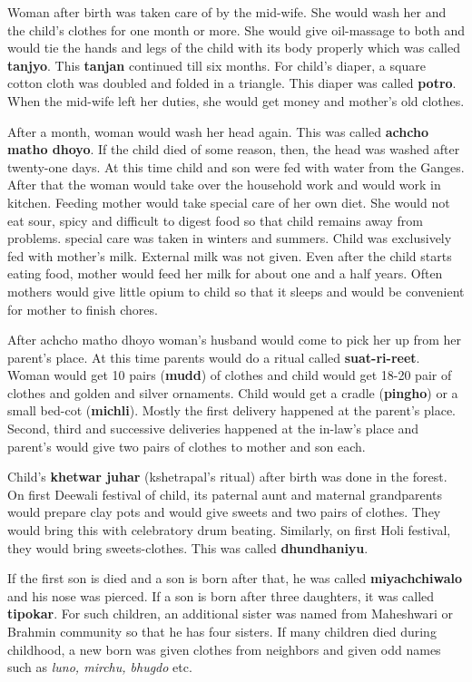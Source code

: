 Woman after birth was taken care of by the mid-wife. She would wash her and
the child's clothes for one month or more. She would give oil-massage to both
and would tie the hands and legs of the child with its body properly which was
called \textbf{tanjyo}. This \textbf{tanjan} continued till six months. For
child's diaper, a square cotton cloth was doubled and folded in a triangle.
This diaper was called \textbf{potro}. When the mid-wife left her duties, she
would get money and mother's old clothes.

After a month, woman would wash her head again. This was called \textbf{achcho
matho dhoyo}. If the child died of some reason, then, the head was washed after
twenty-one days. At this time child and son were fed with water from the
Ganges. After that the woman would take over the household work and would work
in kitchen. Feeding mother would take special care of her own diet. She would
not eat sour, spicy and difficult to digest food so that child remains away
from problems. special care was taken in winters and summers. Child was
exclusively fed with mother's milk. External milk was not given. Even after the
child starts eating food, mother would feed her milk for about one and a half
years. Often mothers would give little opium to child so that it sleeps and
would be convenient for mother to finish chores.

After achcho matho dhoyo woman's husband would come to pick her up from her
parent's place. At this time parents would do a ritual called
\textbf{suat-ri-reet}. Woman would get 10 pairs (\textbf{mudd}) of clothes and
child would get 18-20 pair of clothes and golden and silver ornaments. Child
would get a cradle (\textbf{pingho}) or a small bed-cot (\textbf{michli}).
Mostly the first delivery happened at the parent's place. Second, third and
successive deliveries happened at the in-law's place and parent's would give
two pairs of clothes to mother and son each.

Child's \textbf{khetwar juhar} (kshetrapal's ritual) after birth was done in
the forest. On first Deewali festival of child, its paternal aunt and maternal
grandparents would prepare clay pots and would give sweets and two pairs of
clothes. They would bring this with celebratory drum beating. Similarly, on
first Holi festival, they would bring sweets-clothes. This was called
\textbf{dhundhaniyu}.

If the first son is died and a son is born after that, he was called
\textbf{miyachchiwalo} and his nose was pierced. If a son is born after three
daughters, it was called \textbf{tipokar}. For such children, an additional
sister was named from Maheshwari or Brahmin community so that he has four
sisters. If many children died during childhood, a new born was given clothes
from neighbors and given odd names such as \textit{luno, mirchu, bhugdo} etc.

